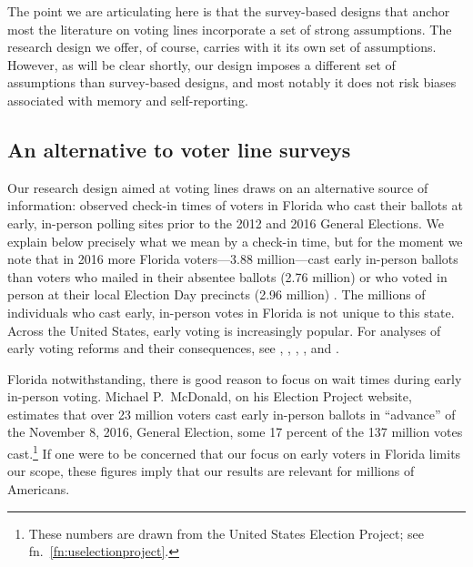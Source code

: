 \documentclass[12pt,titlepage]{article}
\begin{document}
The point we are articulating here is that the survey-based designs
that anchor most the literature on voting lines incorporate a set of
strong assumptions.  The research design we offer, of course, carries
with it its own set of assumptions.  However, as will be clear
shortly, our design imposes a different set of assumptions than
survey-based designs, and most notably it does not risk biases
associated with memory and self-reporting.

\subsection*{An alternative to voter line surveys}

Our research design aimed at voting lines draws on an alternative
source of information: observed check-in times of voters in Florida
who cast their ballots at early, in-person polling sites prior to the
2012 and 2016 General Elections.  We explain below precisely what we
mean by a check-in time, but for the moment we note that in 2016 more
Florida voters---3.88 million---cast early in-person ballots than
voters who mailed in their absentee ballots (2.76 million) or who
voted in person at their local Election Day precincts (2.96 million)
\citep{FDOS:2016vote}.  The millions of individuals who cast early,
in-person votes in Florida is not unique to this state. Across the
United States, early voting is increasingly popular.  For analyses of
early voting reforms and their consequences, see
\citet{neelyrichardson:earlyvoting}, \citet{gronkebaum:growth},
\citet{gronketoffey:psychological}, \citet{gronke:2012}, and
\citet{burdenetal:unanticipated}.




Florida notwithstanding, there is good reason to focus on wait times
during early in-person voting.  Michael P.\ McDonald, on his Election
Project website, estimates that over 23 million voters cast early
in-person ballots in ``advance'' of the November 8, 2016, General
Election, some 17 percent of the 137 million votes
cast.\footnote{These numbers are drawn from the United States Election
  Project; see fn.\ \ref{fn:uselectionproject}.} If one were to be
concerned that our focus on early voters in Florida limits our scope,
these figures imply that our results are relevant for millions of
Americans.
\end{document}
